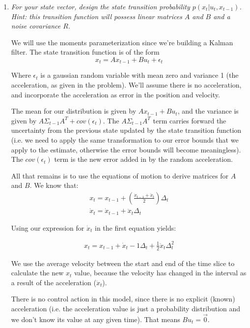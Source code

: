 \documentclass[10pt]{article}
\begin{document}
\begin{enumerate}
\begin{enumerate}
    \item \textit{For your state vector, design the state transition probability
      $p(x_t | u_t,x_{t-1})$. Hint: this transition function will possess linear
      matrices $A$ and $B$ and a noise covariance $R$.}

      We will use the moments parameterization since we're building a Kalman filter.
      The state transition function is of the form
      $$x_t = A x_{t-1} + B u_t + \epsilon_t$$

      Where $\epsilon_t$ is a gaussian random variable with mean zero and variance 1
      (the acceleration, as given in the problem). We'll assume there is no
      acceleration, and incorporate the acceleration as error in the position and
      velocity.

      The mean for our distribution is given by $A x_{t-1} + B u_t$, and the
      variance is given by $A\Sigma_{t-1}A^T + cov(\epsilon_t)$. The
      $A\Sigma_{t-1}A^T$ term carries forward the uncertainty from the previous state
      updated by the state transition function (i.e. we need to apply the same
      transformation to our error bounds that we apply to the estimate, otherwise
      the error bounds will become meaningless). The $cov(\epsilon_t)$ term is the
      new error added in by the random acceleration.

      All that remains is to use the equations of motion to derive matrices for $A$
      and $B$. We know that:
      \begin{gather}
        x_t = x_{t-1} + \left(\frac{\dot{x}_{t-1}+\dot{x}_t}{2}\right) \Delta_t \\ 
        \dot{x}_t = \dot{x}_{t-1} + \ddot{x}_t\Delta_t 
      \end{gather}

      Using our expression for $\dot{x}_t$ in the first equation yields:

      \begin{gather}
        x_t = x_{t-1} + \dot{x}_t-1\Delta_t + \frac{1}{2}\ddot{x}_t\Delta_t^2
      \end{gather}

      We use the average velocity between the start and end of the time slice to
      calculate the new $x_t$ value, because the velocity has changed in the
      interval as a result of the acceleration ($\ddot{x}_{t}$).

      There is no control action in this model, since there is no explicit (known)
      acceleration (i.e. the acceleration value is just a probability distribution
      and we don't know its value at any given time). That means $B u_t = \vec{0}$.


\end{enumerate}
\end{enumerate}
\end{document}
